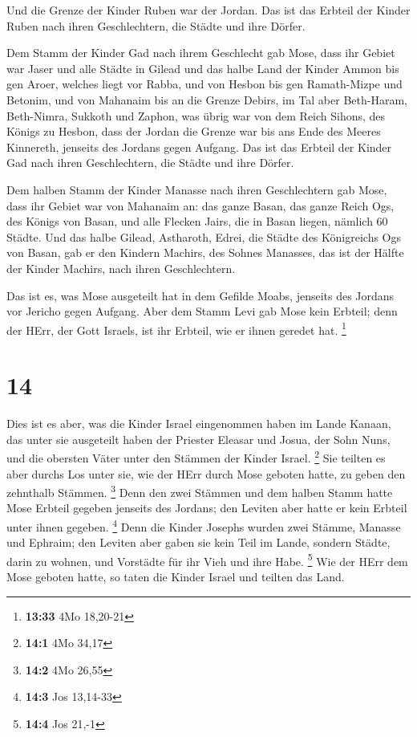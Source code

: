  Und die Grenze der Kinder Ruben war der Jordan. Das ist
das Erbteil der Kinder Ruben nach ihren Geschlechtern, die Städte und
ihre Dörfer.

 Dem Stamm der Kinder Gad nach ihrem Geschlecht gab Mose,
 dass ihr Gebiet war Jaser und alle Städte in Gilead und
das halbe Land der Kinder Ammon bis gen Aroer, welches liegt vor Rabba,
 und von Hesbon bis gen Ramath-Mizpe und Betonim, und von
Mahanaim bis an die Grenze Debirs,  im Tal aber Beth-Haram,
Beth-Nimra, Sukkoth und Zaphon, was übrig war von dem Reich Sihons, des
Königs zu Hesbon, dass der Jordan die Grenze war bis ans Ende des Meeres
Kinnereth, jenseits des Jordans gegen Aufgang.  Das ist das
Erbteil der Kinder Gad nach ihren Geschlechtern, die Städte und ihre
Dörfer.

 Dem halben Stamm der Kinder Manasse nach ihren
Geschlechtern gab Mose,  dass ihr Gebiet war von Mahanaim
an: das ganze Basan, das ganze Reich Ogs, des Königs von Basan, und alle
Flecken Jairs, die in Basan liegen, nämlich 60 Städte.  Und
das halbe Gilead, Astharoth, Edrei, die Städte des Königreichs Ogs von
Basan, gab er den Kindern Machirs, des Sohnes Manasses, das ist der
Hälfte der Kinder Machirs, nach ihren Geschlechtern.

 Das ist es, was Mose ausgeteilt hat in dem Gefilde Moabs,
jenseits des Jordans vor Jericho gegen Aufgang.  Aber dem
Stamm Levi gab Mose kein Erbteil; denn der HErr, der Gott Israels, ist
ihr Erbteil, wie er ihnen geredet hat. \footnote{\textbf{13:33} 4Mo
  18,20-21}

\hypertarget{section-5}{%
\section{14}\label{section-5}}

 Dies ist es aber, was die Kinder Israel eingenommen haben
im Lande Kanaan, das unter sie ausgeteilt haben der Priester Eleasar und
Josua, der Sohn Nuns, und die obersten Väter unter den Stämmen der
Kinder Israel. \footnote{\textbf{14:1} 4Mo 34,17}  Sie
teilten es aber durchs Los unter sie, wie der HErr durch Mose geboten
hatte, zu geben den zehnthalb Stämmen. \footnote{\textbf{14:2} 4Mo 26,55}
 Denn den zwei Stämmen und dem halben Stamm hatte Mose
Erbteil gegeben jenseits des Jordans; den Leviten aber hatte er kein
Erbteil unter ihnen gegeben. \footnote{\textbf{14:3} Jos 13,14-33}
 Denn die Kinder Josephs wurden zwei Stämme, Manasse und
Ephraim; den Leviten aber gaben sie kein Teil im Lande, sondern Städte,
darin zu wohnen, und Vorstädte für ihr Vieh und ihre Habe. \footnote{\textbf{14:4}
  Jos 21,-1}  Wie der HErr dem Mose geboten hatte, so taten
die Kinder Israel und teilten das Land.

